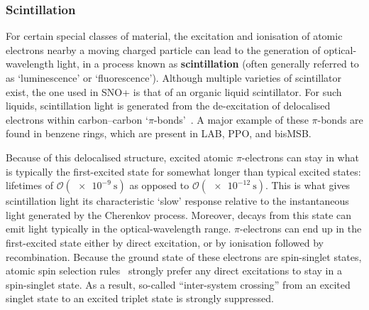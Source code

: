 \subsubsection{Scintillation}\label{sec:scintillation}
For certain special classes of material, the excitation and ionisation of atomic electrons nearby a moving charged particle can lead to the generation of optical-wavelength light, in a process known as \textbf{scintillation} (often generally referred to as `luminescence' or `fluorescence'). Although multiple varieties of scintillator exist, the one used in SNO+ is that of an organic liquid scintillator. For such liquids, scintillation light is generated from the de-excitation of delocalised electrons within carbon--carbon `$\pi$-bonds'~\cite{birksChapterScintillationProcess1967}. A major example of these $\pi$-bonds are found in benzene rings, which are present in LAB, PPO, and bisMSB.

Because of this delocalised structure, excited atomic $\pi$-electrons can stay in what is typically the first-excited state for somewhat longer than typical excited states: lifetimes of $\mathcal{O}(\SI{e-9}{\second})$ as opposed to $\mathcal{O}(\SI{e-12}{\second})$. This is what gives scintillation light its characteristic `slow' response relative to the instantaneous light generated by the Cherenkov process. Moreover, decays from this state can emit light typically in the optical-wavelength range. 
$\pi$-electrons can end up in the first-excited state either by direct excitation, or by ionisation followed by recombination. Because the ground state of these electrons are spin-singlet states, atomic spin selection rules~\cite{birksChapterScintillationProcess1967} strongly prefer any direct excitations to stay in a spin-singlet state. As a result, so-called ``inter-system crossing'' from an excited singlet state to an excited triplet state is strongly suppressed.

